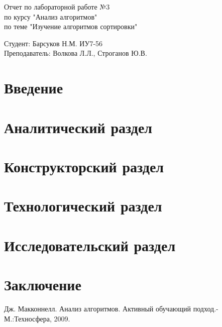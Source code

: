 \documentclass[a4paper, 14pt]{article}
\begin{document}
	\begin{titlepage}
		\begin{center}
			\begin{LARGE}
				Отчет по лабораторной работе №3\\
				по курсу "Анализ алгоритмов"\\
				по теме "Изучение алгоритмов сортировки"
			\end{LARGE}
			
			\begin{Large}
				\vspace{10cm}
				Студент: Барсуков Н.М. ИУ7-56\\
				Преподаватель: Волкова Л.Л.,
				Строганов Ю.В.
			\end{Large}
		\end{center}
	\end{titlepage}

	\newpage
	\tableofcontents

	\newpage
	\section*{Введение}
	
	
	\newpage
	\section{Аналитический раздел}
	
	
	\newpage
		\section{Конструкторский раздел}
	
	
	\newpage
	\section{Технологический раздел}
	
	
	\newpage
	\section{Исследовательский раздел}
	
	
	\newpage
	\section{Заключение}
	
	
	\newpage
	\begin{thebibliography}{4}
		Дж. Макконнелл. Анализ алгоритмов. Активный обучающий подход.-
		М.:Техносфера, 2009.
	\end{thebibliography}
	
	
\end{document}
